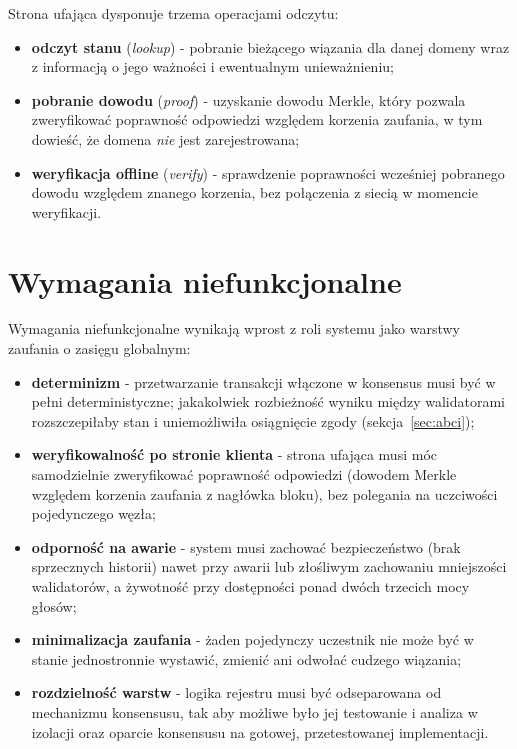 Strona ufająca dysponuje trzema operacjami odczytu:
\begin{itemize}
    \item \textbf{odczyt stanu} (\emph{lookup}) - pobranie bieżącego wiązania dla danej domeny wraz z informacją o jego ważności i ewentualnym unieważnieniu;
    \item \textbf{pobranie dowodu} (\emph{proof}) - uzyskanie dowodu Merkle, który pozwala zweryfikować poprawność odpowiedzi względem korzenia zaufania, w tym dowieść, że domena \emph{nie} jest zarejestrowana;
    \item \textbf{weryfikacja offline} (\emph{verify}) - sprawdzenie poprawności wcześniej pobranego dowodu względem znanego korzenia, bez połączenia z siecią w momencie weryfikacji.
\end{itemize}

\section{Wymagania niefunkcjonalne}
\label{sec:wymagania-niefunkcjonalne}

Wymagania niefunkcjonalne wynikają wprost z roli systemu jako warstwy zaufania o zasięgu globalnym:
\begin{itemize}
    \item \textbf{determinizm} - przetwarzanie transakcji włączone w konsensus musi być w pełni deterministyczne; jakakolwiek rozbieżność wyniku między walidatorami rozszczepiłaby stan i uniemożliwiła osiągnięcie zgody (sekcja~\ref{sec:abci});
    \item \textbf{weryfikowalność po stronie klienta} - strona ufająca musi móc samodzielnie zweryfikować poprawność odpowiedzi (dowodem Merkle względem korzenia zaufania z nagłówka bloku), bez polegania na uczciwości pojedynczego węzła;
    \item \textbf{odporność na awarie} - system musi zachować bezpieczeństwo (brak sprzecznych historii) nawet przy awarii lub złośliwym zachowaniu mniejszości walidatorów, a żywotność przy dostępności ponad dwóch trzecich mocy głosów;
    \item \textbf{minimalizacja zaufania} - żaden pojedynczy uczestnik nie może być w stanie jednostronnie wystawić, zmienić ani odwołać cudzego wiązania;
    \item \textbf{rozdzielność warstw} - logika rejestru musi być odseparowana od mechanizmu konsensusu, tak aby możliwe było jej testowanie i analiza w izolacji oraz oparcie konsensusu na gotowej, przetestowanej implementacji.
\end{itemize}

